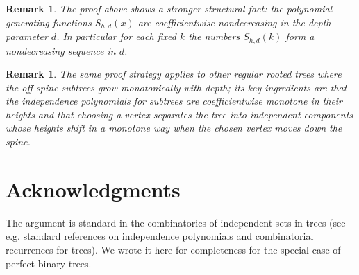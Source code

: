 \documentclass[11pt]{article}
\newtheorem{remark}[theorem]{Remark}
\begin{document}
\begin{remark}
	The proof above shows a stronger structural fact: the polynomial generating functions $S_{h,d}(x)$ are coefficientwise nondecreasing in the depth parameter $d$. In particular for each fixed $k$ the numbers $S_{h,d}(k)$ form a nondecreasing sequence in $d$.
\end{remark}

\begin{remark}
	The same proof strategy applies to other regular rooted trees where the off-spine subtrees grow monotonically with depth; its key ingredients are that the independence polynomials for subtrees are coefficientwise monotone in their heights and that choosing a vertex separates the tree into independent components whose heights shift in a monotone way when the chosen vertex moves down the spine.
\end{remark}

\section*{Acknowledgments}

The argument is standard in the combinatorics of independent sets in trees (see e.g. standard references on independence polynomials and combinatorial recurrences for trees). We wrote it here for completeness for the special case of perfect binary trees.
\end{document}
